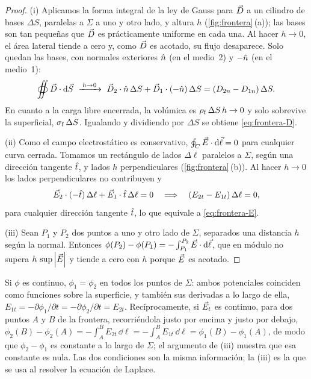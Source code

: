 \begin{proof}
(i) Aplicamos la forma integral de la ley de Gauss para $\vec D$ a un cilindro de bases $\Delta S$, paralelas a $\Sigma$ a uno
y otro lado, y altura $h$ (\cref{fig:frontera}\,(a)); las bases son tan pequeñas que $\vec D$ es prácticamente uniforme en
cada una. Al hacer $h\to0$, el área lateral tiende a cero y, como $\vec D$ es acotado, su flujo desaparece. Solo quedan las
bases, con normales exteriores $\hat n$ (en el medio~2) y $-\hat n$ (en el medio~1):
\[
  \oiint\vD\cdot\dS\ \xrightarrow{\;h\to0\;}\ \vD_2\cdot\nn\,\Delta S+\vD_1\cdot(-\nn)\,\Delta S=(D_{2n}-D_{1n})\,\Delta S .
\]
En cuanto a la carga libre encerrada, la volúmica es $\rho_{\mathrm f}\,\Delta S\,h\to0$ y solo sobrevive la superficial, $\sigma_{\mathrm f}\,\Delta S$.
Igualando y dividiendo por $\Delta S$ se obtiene \eqref{eq:frontera-D}.

(ii) Como el campo electrostático es conservativo, $\oint_C\vec E\cdot\mathop{}\!\mathrm{d}\vec\ell=0$ para cualquier curva cerrada. Tomamos un rectángulo
de lados $\Delta\ell$ paralelos a $\Sigma$, según una dirección tangente $\hat t$, y lados $h$ perpendiculares (\cref{fig:frontera}\,(b)).
Al hacer $h\to0$ los lados perpendiculares no contribuyen y
\[
  \vec E_2\cdot(-\hat t)\,\Delta\ell+\vec E_1\cdot\hat t\,\Delta\ell=0
  \quad\Longrightarrow\quad (E_{2t}-E_{1t})\,\Delta\ell=0 ,
\]
para cualquier dirección tangente $\hat t$, lo que equivale a \eqref{eq:frontera-E}.

(iii) Sean $P_1$ y $P_2$ dos puntos a uno y otro lado de $\Sigma$, separados una distancia $h$ según la normal. Entonces
$\phi(P_2)-\phi(P_1)=-\int_{P_1}^{P_2}\vec E\cdot\mathop{}\!\mathrm{d}\vec\ell$, que en módulo no supera $h\,\sup\left\lvert \vec E\right\rvert$ y tiende a cero con $h$ porque $\vec E$ es acotado.
\end{proof}

\begin{observacion}\label{obs:phi-Et}
Si $\phi$ es continuo, $\phi_1=\phi_2$ en todos los puntos de $\Sigma$: ambos potenciales coinciden como funciones sobre la
superficie, y también sus derivadas a lo largo de ella, $E_{1t}=-\partial\phi_1/\partial t=-\partial\phi_2/\partial t=E_{2t}$. Recíprocamente, si
$\vec E_t$ es continuo, para dos puntos $A$ y $B$ de la frontera, recorriéndola justo por encima y justo por debajo,
$\phi_2(B)-\phi_2(A)=-\int_A^BE_{2t}\,\dd\ell=-\int_A^BE_{1t}\,\dd\ell=\phi_1(B)-\phi_1(A)$, de modo que $\phi_2-\phi_1$ es constante a lo largo
de $\Sigma$; el argumento de (iii) muestra que esa constante es nula. Las dos condiciones son la misma
información; la (iii) es la que se usa al resolver la ecuación de Laplace.
\end{observacion}


